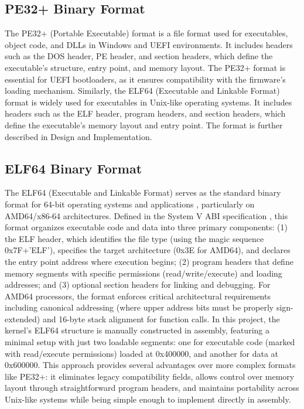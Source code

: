 \documentclass[conference]{IEEEtran}
\begin{document}
\subsection{PE32+ Binary Format}
The PE32+ (Portable Executable) format is a file format used for executables, object code, and DLLs in Windows and UEFI environments. It includes headers such as the DOS header, PE header, and section headers, which define the executable's structure, entry point, and memory layout. The PE32+ format is essential for UEFI bootloaders, as it ensures compatibility with the firmware's loading mechanism. Similarly, the ELF64 (Executable and Linkable Format) format is widely used for executables in Unix-like operating systems. It includes headers such as the ELF header, program headers, and section headers, which define the executable's memory layout and entry point. The format is further described in Design and Implementation.

\subsection{ELF64 Binary Format}
The ELF64 (Executable and Linkable Format) serves as the standard binary format for 64-bit operating systems and applications \cite{elflatest}, particularly on AMD64/x86-64 architectures. Defined in the System V ABI specification \cite{supplement64}, this format organizes executable code and data into three primary components: (1) the ELF header, which identifies the file type (using the magic sequence 0x7F+'ELF'), specifies the target architecture (0x3E for AMD64), and declares the entry point address where execution begins; (2) program headers that define memory segments with specific permissions (read/write/execute) and loading addresses; and (3) optional section headers for linking and debugging. For AMD64 processors, the format enforces critical architectural requirements including canonical addressing (where upper address bits must be properly sign-extended) and 16-byte stack alignment for function calls. In this project, the kernel's ELF64 structure is manually constructed in assembly, featuring a minimal setup with just two loadable segments: one for executable code (marked with read/execute permissions) loaded at 0x400000, and another for data at 0x600000. This approach provides several advantages over more complex formats like PE32+: it eliminates legacy compatibility fields, allows control over memory layout through straightforward program headers, and maintains portability across Unix-like systems while being simple enough to implement directly in assembly.
\end{document}
